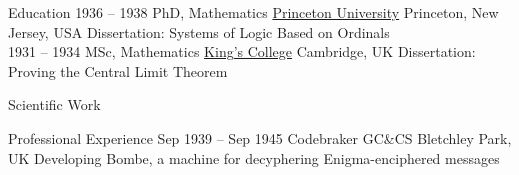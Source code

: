 \documentclass[a4paper]{materialcv} %
\begin{document}

\begin{cvsection}{Education}
	\cvitem%
		{1936 -- 1938}%
		{PhD, Mathematics}%
		{\href{http://princeton.edu/}{Princeton University}}%
		{Princeton, New Jersey, USA}%
		{Dissertation: Systems of Logic Based on Ordinals}\\
	\cvitem%
		{1931 -- 1934}%
		{MSc, Mathematics}%
		{\href{http://www.kings.cam.ac.uk/}{King's College}}%
		{Cambridge, UK}%
		{Dissertation: Proving the Central Limit Theorem}
	\end{cvsection}

	\begin{cvsection}{Scientific Work}
	\end{cvsection}

	\begin{cvsection}{Professional Experience}
		\cvitem
			{Sep 1939 -- Sep 1945}%
			{Codebraker}%
			{GC\&CS}%
			{Bletchley Park, UK}%
			{Developing Bombe, a machine for decyphering Enigma-enciphered messages}
	\end{cvsection}

	\makeprofile
\end{document}
